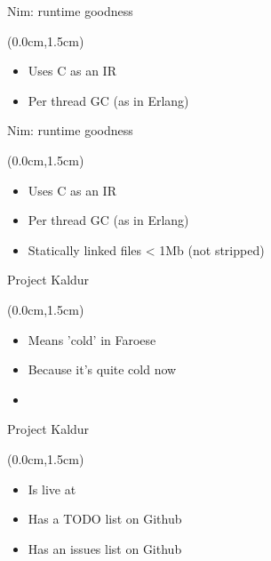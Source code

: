 \documentclass[xetex,14pt,aspectratio=169]{beamer}
\begin{document}
\begin{frame}{Nim: runtime goodness}
\begin{textblock*}{\framewidth-0.8cm}(0.0cm,1.5cm) %
\begin{itemize}
  \item Uses C as an IR
  \item Per thread GC (as in Erlang)
\end{itemize}
\end{textblock*}
\end{frame}

\begin{frame}{Nim: runtime goodness}
\begin{textblock*}{\framewidth-0.8cm}(0.0cm,1.5cm) %
\begin{itemize}
  \item Uses C as an IR
  \item Per thread GC (as in Erlang)
  \item Statically linked files < 1Mb (not stripped)
\end{itemize}
\end{textblock*}
\end{frame}

\begin{frame}{Project Kaldur}
\begin{textblock*}{\framewidth-0.8cm}(0.0cm,1.5cm) %
\begin{itemize}
  \item Means 'cold' in Faroese
  \item Because it's quite cold now
  \item \href{https://github.com/alexclear/kaldur}{\color{blue}{https://github.com/alexclear/kaldur}}
\end{itemize}
\end{textblock*}
\end{frame}

\begin{frame}{Project Kaldur}
\begin{textblock*}{\framewidth-0.8cm}(0.0cm,1.5cm) %
\begin{itemize}
  \item Is live at \href{http://185.37.61.240:5000}{\color{blue}{http://185.37.61.240:5000}}
  \item Has a TODO list on Github
  \item Has an issues list on Github
\end{itemize}
\end{textblock*}
\end{frame}
\end{document}
